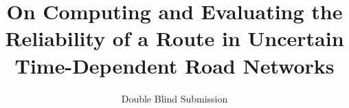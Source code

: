 \documentclass[]{sig-alternate}
\title{On Computing and Evaluating the Reliability of a Route in
Uncertain Time-Dependent Road Networks}
\author{Double Blind Submission}
\begin{document}
\maketitle

%

\begin{abstract}


\end{abstract}
\end{document}
